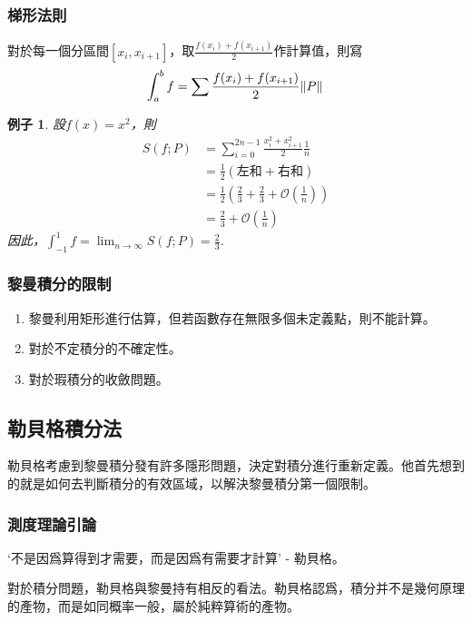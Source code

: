 \documentclass[12pt]{article}
\newtheorem*{example}{例子}
\begin{document}
    \subsubsection*{梯形法則}
    對於每一個分區間$[x_i,x_{i+1}]$，取$\frac{f(x_i)+f(x_{i+1})}{2}$作計算值，則寫$$\int_a^b f=\sum \frac{f(x_i)+f(x_{i+1})}{2}\norm*{P}$$

    \begin{example}
        設$f(x)=x^2$，則\begin{align*}
            S(f;P)&=\sum_{i=0}^{2n-1} \frac{x_i^2+x_{i+1}^2}{2} \frac{1}{n}\\
            &=\frac{1}{2}(\textrm{左和}+\textrm{右和})\\
            &=\frac{1}{2}(\frac{2}{3}+\frac{2}{3}+\mathcal{O}(\frac{1}{n}))\\
            &=\frac{2}{3}+\mathcal{O}(\frac{1}{n})
        \end{align*}
        因此，$\displaystyle\int_{-1}^1 f = \lim_{n\to \infty}S(f;P)=\frac{2}{3}$.
    \end{example}

    \subsubsection*{黎曼積分的限制}

    \begin{enumerate}
        \item 黎曼利用矩形進行估算，但若函數存在無限多個未定義點，則不能計算。
        \item 對於不定積分的不確定性。
        \item 對於瑕積分的收斂問題。
    \end{enumerate}
    \subsection*{勒貝格積分法}

    勒貝格考慮到黎曼積分發有許多隱形問題，決定對積分進行重新定義。他首先想到的就是如何去判斷積分的有效區域，以解決黎曼積分第一個限制。

    \subsubsection*{測度理論引論}

    `不是因爲算得到才需要，而是因爲有需要才計算' - 勒貝格。

    對於積分問題，勒貝格與黎曼持有相反的看法。勒貝格認爲，積分并不是幾何原理的產物，而是如同概率一般，屬於純粹算術的產物。
\end{document}
